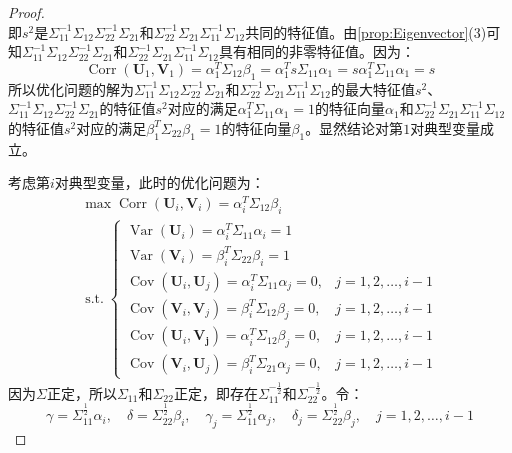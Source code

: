 \begin{proof}
\begin{equation*}
	\end{equation*}
	即$s^2$是$\Sigma_{11}^{-1}\Sigma_{12}\Sigma_{22}^{-1}\Sigma_{21}$和$\Sigma_{22}^{-1}\Sigma_{21}\Sigma_{11}^{-1}\Sigma_{12}$共同的特征值。由\cref{prop:Eigenvector}(3)可知$\Sigma_{11}^{-1}\Sigma_{12}\Sigma_{22}^{-1}\Sigma_{21}$和$\Sigma_{22}^{-1}\Sigma_{21}\Sigma_{11}^{-1}\Sigma_{12}$具有相同的非零特征值。因为：
	\begin{equation*}
		\operatorname{Corr}(\mathbf{U}_1,\mathbf{V}_1)=\alpha_1^T\Sigma_{12}\beta_1=\alpha_1^Ts\Sigma_{11}\alpha_1=s\alpha_1^T\Sigma_{11}\alpha_1=s
	\end{equation*}
	所以优化问题的解为$\Sigma_{11}^{-1}\Sigma_{12}\Sigma_{22}^{-1}\Sigma_{21}$和$\Sigma_{22}^{-1}\Sigma_{21}\Sigma_{11}^{-1}\Sigma_{12}$的最大特征值$s^2$、$\Sigma_{11}^{-1}\Sigma_{12}\Sigma_{22}^{-1}\Sigma_{21}$的特征值$s^2$对应的满足$\alpha_1^T\Sigma_{11}\alpha_1=1$的特征向量$\alpha_1$和$\Sigma_{22}^{-1}\Sigma_{21}\Sigma_{11}^{-1}\Sigma_{12}$的特征值$s^2$对应的满足$\beta_1^T\Sigma_{22}\beta_1=1$的特征向量$\beta_1$。显然结论对第$1$对典型变量成立。\par
	考虑第$i$对典型变量，此时的优化问题为：
	\begin{gather*}
		\max\operatorname{Corr}(\mathbf{U}_i,\mathbf{V}_i)=\alpha_i^T\Sigma_{12}\beta_i \\
		\operatorname{s.t.}
		\begin{cases}
			\operatorname{Var}(\mathbf{U}_i)=\alpha_i^T\Sigma_{11}\alpha_i=1 \\
			\operatorname{Var}(\mathbf{V}_i)=\beta_i^T\Sigma_{22}\beta_i=1 \\
			\operatorname{Cov}(\mathbf{U}_i,\mathbf{U}_j)=\alpha_i^T\Sigma_{11}\alpha_j=0,&j=1,2,\dots,i-1 \\
			\operatorname{Cov}(\mathbf{V}_i,\mathbf{V}_j)=\beta_i^T\Sigma_{12}\beta_j=0,&j=1,2,\dots,i-1 \\
			\operatorname{Cov}(\mathbf{U}_i,\mathbf{V_j})=\alpha_i^T\Sigma_{12}\beta_j=0,&j=1,2,\dots,i-1 \\
			\operatorname{Cov}(\mathbf{V}_i,\mathbf{U}_j)=\beta_i^T\Sigma_{21}\alpha_j=0,&j=1,2,\dots,i-1
		\end{cases}
	\end{gather*}
	因为$\Sigma$正定，所以$\Sigma_{11}$和$\Sigma_{22}$正定，即存在$\Sigma_{11}^{-\frac{1}{2}}$和$\Sigma_{22}^{-\frac{1}{2}}$。令：
	\begin{equation*}
		\gamma=\Sigma_{11}^{\frac{1}{2}}\alpha_i,\quad\delta=\Sigma_{22}^{\frac{1}{2}}\beta_i,\quad\gamma_j=\Sigma_{11}^{\frac{1}{2}}\alpha_j,\quad\delta_j=\Sigma_{22}^{\frac{1}{2}}\beta_j,\quad j=1,2,\dots,i-1

\end{equation*}
\end{proof}
